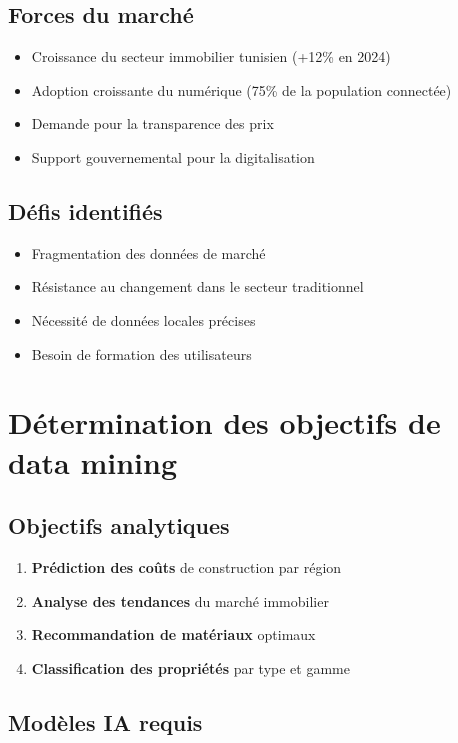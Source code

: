 \documentclass[12pt,a4paper]{report}
\begin{document}
\subsection{Forces du marché}
\begin{itemize}
    \item Croissance du secteur immobilier tunisien (+12\% en 2024)
    \item Adoption croissante du numérique (75\% de la population connectée)
    \item Demande pour la transparence des prix
    \item Support gouvernemental pour la digitalisation
\end{itemize}

\subsection{Défis identifiés}
\begin{itemize}
    \item Fragmentation des données de marché
    \item Résistance au changement dans le secteur traditionnel
    \item Nécessité de données locales précises
    \item Besoin de formation des utilisateurs
\end{itemize}

\section{Détermination des objectifs de data mining}

\subsection{Objectifs analytiques}

\begin{enumerate}
    \item \textbf{Prédiction des coûts} de construction par région
    \item \textbf{Analyse des tendances} du marché immobilier
    \item \textbf{Recommandation de matériaux} optimaux
    \item \textbf{Classification des propriétés} par type et gamme
\end{enumerate}

\subsection{Modèles IA requis}
\end{document}
